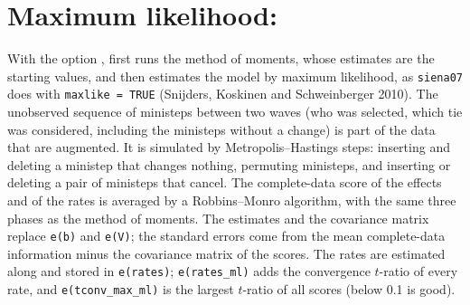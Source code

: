 \section{Maximum likelihood: }\label{sec:ml}
With the option , \nwsaom{} first runs the method of moments, whose estimates are the starting values, and then estimates the model by maximum likelihood, as \texttt{siena07} does with \texttt{maxlike = TRUE} (Snijders, Koskinen and Schweinberger 2010). The unobserved sequence of ministeps between two waves (who was selected, which tie was considered, including the ministeps without a change) is part of the data that are augmented. It is simulated by Metropolis--Hastings steps: inserting and deleting a ministep that changes nothing, permuting ministeps, and inserting or deleting a pair of ministeps that cancel. The complete-data score of the effects and of the rates is averaged by a Robbins--Monro algorithm, with the same three phases as the method of moments. The estimates and the covariance matrix replace \texttt{e(b)} and \texttt{e(V)}; the standard errors come from the mean complete-data information minus the covariance matrix of the scores. The rates are estimated along and stored in \texttt{e(rates)}; \texttt{e(rates\_ml)} adds the convergence $t$-ratio of every rate, and \texttt{e(tconv\_max\_ml)} is the largest $t$-ratio of all scores (below 0.1 is good).

